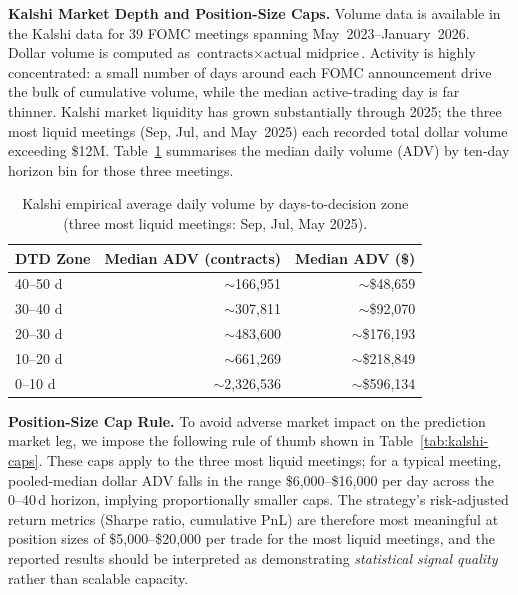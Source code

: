 \textbf{Kalshi Market Depth and Position-Size Caps.} Volume data is available
in the Kalshi data for 39 FOMC meetings spanning May~2023--January~2026.
Dollar volume is computed as $\text{contracts} \times \text{actual midprice}$. Activity is highly concentrated: a small number of
days around each FOMC announcement drive the bulk of cumulative volume, while
the median active-trading day is far thinner. Kalshi market liquidity has grown
substantially through 2025; the three most liquid meetings (Sep, Jul, and
May~2025) each recorded total dollar volume exceeding \$12M.
Table~\ref{tab:kalshi-adv} summarises the median daily volume (ADV) by
ten-day horizon bin for those three meetings.

\begin{table}[h]
    \centering
    \caption{Kalshi empirical average daily volume by days-to-decision zone
             (three most liquid meetings: Sep, Jul, May 2025).}
    \label{tab:kalshi-adv}
    \begin{tabular}{lrr}
        \toprule
        \textbf{DTD Zone} &
        \textbf{Median ADV (contracts)} &
        \textbf{Median ADV (\$)} \\
        \midrule
        40--50 d & $\sim$166,951   & $\sim$\$48,659  \\
        30--40 d & $\sim$307,811   & $\sim$\$92,070  \\
        20--30 d & $\sim$483,600   & $\sim$\$176,193 \\
        10--20 d & $\sim$661,269   & $\sim$\$218,849 \\
         0--10 d & $\sim$2,326,536 & $\sim$\$596,134 \\
        \bottomrule
    \end{tabular}
\end{table}


\textbf{Position-Size Cap Rule.}
To avoid adverse market impact on the prediction market leg, we impose the following
rule of thumb shown in Table~\ref{tab:kalshi-caps}. These caps apply to the
three most liquid meetings; for a typical meeting, pooled-median dollar ADV
falls in the range \$6,000--\$16,000 per day across the 0--40\,d horizon,
implying proportionally smaller caps. The strategy's risk-adjusted return
metrics (Sharpe ratio, cumulative PnL) are therefore most meaningful at
position sizes of \$5,000--\$20,000 per trade for the most liquid meetings,
and the reported results should be interpreted as demonstrating
\emph{statistical signal quality} rather than scalable capacity.

